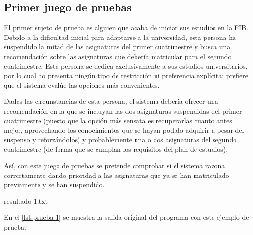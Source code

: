 
\subsection{Primer juego de pruebas} \label{sec:prueba-1}

El primer sujeto de prueba es alguien que acaba de iniciar sus estudios en la 
FIB. Debido a la dificultad inicial para adaptarse a la universidad, esta 
persona ha suspendido la mitad de las asignaturas del primer cuatrimestre y 
busca una recomendación sobre las asignaturas que debería matricular para el 
segundo cuatrimestre. Esta persona se dedica exclusivamente a sus estudios 
universitarios, por lo cual no presenta ningún tipo de restricción ni 
preferencia explícita: prefiere que el sistema evalúe las opciones más 
convenientes. 

Dadas las circunstancias de esta persona, el sistema debería ofrecer una 
recomendación en la que se incluyan las dos asignaturas suspendidas del primer 
cuatrimestre (puesto que la opción más sensata es recuperarlas cuanto antes 
mejor, aprovechando los conocimientos que se hayan podido adquirir a pesar del 
suspenso y reforzándolos) y probablemente una o dos asignaturas del segundo 
cuatrimestre (de forma que se cumplan los requisitos del plan de estudios).

Así, con este juego de pruebas se pretende comprobar si el sistema razona 
correctamente dando prioridad a las asignaturas que ya se han matriculado 
previamente y se han suspendido.

%
    {resultado-1.txt}

En el \autoref{lst:prueba-1} se muestra la salida original del programa con 
este ejemplo de prueba. 



